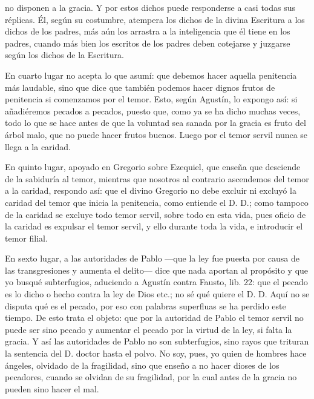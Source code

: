 no disponen a la gracia. Y por estos dichos puede responderse a casi todas sus réplicas. Él, según su costumbre, atempera los dichos de la divina Escritura a los dichos de los padres, más aún los arrastra a la inteligencia que él tiene en los padres, cuando más bien los escritos de los padres deben cotejarse y juzgarse según los dichos de la Escritura.

En cuarto lugar no acepta lo que asumí: que debemos hacer aquella penitencia más laudable, sino que dice que también podemos hacer dignos frutos de penitencia si comenzamos por el temor. Esto, según Agustín, lo expongo así: si añadiéremos pecados a pecados, puesto que, como ya se ha dicho muchas veces, todo lo que se hace antes de que la voluntad sea sanada por la gracia es fruto del árbol malo, que no puede hacer frutos buenos. Luego por el temor servil nunca se llega a la caridad.

En quinto lugar, apoyado en Gregorio sobre Ezequiel, que enseña que desciende de la sabiduría al temor, mientras que nosotros al contrario ascendemos del temor a la caridad, respondo así: que el divino Gregorio no debe excluir ni excluyó la caridad del temor que inicia la penitencia, como entiende el D. D.; como tampoco de la caridad se excluye todo temor servil, sobre todo en esta vida, pues oficio de la caridad es expulsar el temor servil, y ello durante toda la vida, e introducir el temor filial.

En sexto lugar, a las autoridades de Pablo —que la ley fue puesta por causa de las transgresiones y aumenta el delito— dice que nada aportan al propósito y que yo busqué subterfugios, aduciendo a Agustín contra Fausto, lib. 22: que el pecado es lo dicho o hecho contra la ley de Dios etc.; no sé qué quiere el D. D. Aquí no se disputa qué es el pecado, por eso con palabras superfluas se ha perdido este tiempo. De esto trata el objeto: que por la autoridad de Pablo el temor servil no puede ser sino pecado y aumentar el pecado por la virtud de la ley, si falta la gracia. Y así las autoridades de Pablo no son subterfugios, sino rayos que trituran la sentencia del D. doctor hasta el polvo. No soy, pues, yo quien de hombres hace ángeles, olvidado de la fragilidad, sino que enseño a no hacer dioses de los pecadores, cuando se olvidan de su fragilidad, por la cual antes de la gracia no pueden sino hacer el mal.

